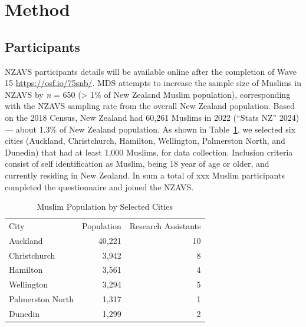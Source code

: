 \documentclass[
]{interact}
\begin{document}
\section{Method}\label{method}

\subsection{Participants}\label{participants}

NZAVS participants details will be available online after the completion
of Wave 15 \url{https://osf.io/75snb/}. MDS attempts to increase the
sample size of Muslims in NZAVS by \emph{n} = 650 (\textgreater{} 1\% of
New Zealand Muslim population), corresponding with the NZAVS sampling
rate from the overall New Zealand population. Based on the 2018 Census,
New Zealand had 60,261 Muslims in 2022 ({``Stats NZ''} 2024) --- about
1.3\% of New Zealand population. As shown in
Table~\ref{tbl-muslim-population}, we selected six cities (Auckland,
Christchurch, Hamilton, Wellington, Palmerston North, and Dunedin) that
had at least 1,000 Muslims, for data collection. Inclusion criteria
consist of self identification as Muslim, being 18 year of age or older,
and currently residing in New Zealand. In sum a total of xxx Muslim
participants completed the questionnaire and joined the NZAVS.

\captionsetup{labelsep=none}

\begingroup
\fontsize{12.0pt}{14.4pt}\selectfont

\begin{longtable}{lrr}

\caption{\label{tbl-muslim-population}}

\tabularnewline

\caption*{
{\large Muslim Population by Selected Cities}
} \\ 
\toprule
City & Population & Research Assistants \\ 
\midrule\addlinespace[2.5pt]
Auckland & 40,221 & 10 \\ 
Christchurch & 3,942 & 8 \\ 
Hamilton & 3,561 & 4 \\ 
Wellington & 3,294 & 5 \\ 
Palmerston North & 1,317 & 1 \\ 
Dunedin & 1,299 & 2 \\ 
\bottomrule

\end{longtable}

\endgroup
\end{document}
